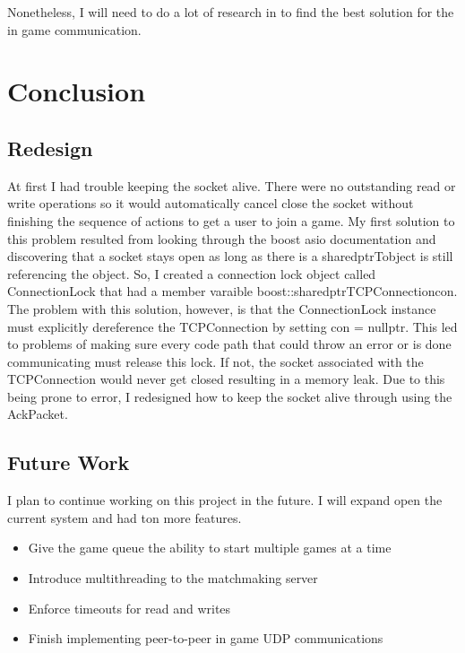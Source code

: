 \documentclass[conference]{IEEEtran}
\begin{document}
Nonetheless, I will need to do a lot of research in to find the best solution for the in game communication.

\section{Conclusion}
\subsection{Redesign}
At first I had trouble keeping the socket alive.
There were no outstanding read or write operations so it would automatically cancel close the socket without finishing the sequence of actions to get a user to join a game. 
My first solution to this problem resulted from looking through the boost asio documentation and discovering that a socket stays open as long as there is a shared\textunderscore ptr\textlangle T\textrangle object is still referencing the object.
So, I created a connection lock object called ConnectionLock that had a member varaible boost::shared\textunderscore ptr\textlangle TCPConnection\textrangle con.
The problem with this solution, however, is that the ConnectionLock instance must explicitly dereference the TCPConnection by setting con = nullptr.
This led to problems of making sure every code path that could throw an error or is done communicating must release this lock.
If not, the socket associated with the TCPConnection would never get closed resulting in a memory leak. 
Due to this being prone to error, I redesigned how to keep the socket alive through using the AckPacket.

\subsection{Future Work}
I plan to continue working on this project in the future.
I will expand open the current system and had ton more features.
\begin{itemize}
	\item Give the game queue the ability to start multiple games at a time
	\item Introduce multithreading to the matchmaking server
	\item Enforce timeouts for read and writes
	\item Finish implementing peer-to-peer in game UDP communications
\end{itemize}
\end{document}
